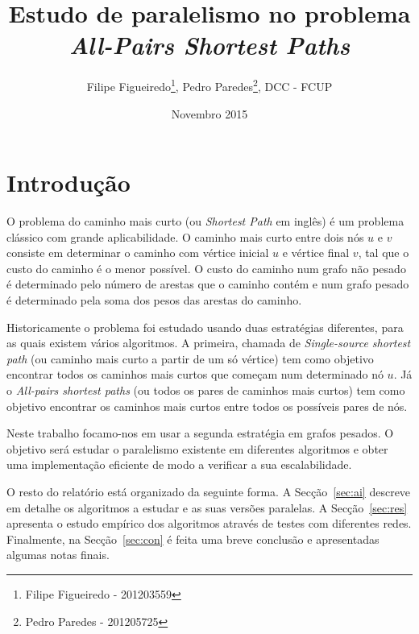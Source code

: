 \documentclass[10pt,a4paper,oneside]{article}
\title{Estudo de paralelismo no problema \textit{All-Pairs Shortest
    Paths}}
\author{Filipe Figueiredo\footnote{Filipe Figueiredo - 201203559},
  Pedro Paredes\footnote{Pedro Paredes - 201205725}, DCC - FCUP}
\date{Novembro 2015}
\begin{document}
\maketitle


\section{Introdução}
\label{sec:intro}
O problema do caminho mais curto (ou \textit{Shortest Path} em inglês)
é um problema clássico com grande aplicabilidade. O caminho mais curto
entre dois nós $u$ e $v$ consiste em determinar o caminho com vértice
inicial $u$ e vértice final $v$, tal que o custo do caminho é o menor
possível. O custo do caminho num grafo não pesado é determinado pelo
número de arestas que o caminho contém e num grafo pesado é
determinado pela soma dos pesos das arestas do caminho.

Historicamente o problema foi estudado usando duas estratégias
diferentes, para as quais existem vários algoritmos. A primeira,
chamada de \textit{Single-source shortest path} (ou caminho mais curto
a partir de um só vértice) tem como objetivo encontrar todos os
caminhos mais curtos que começam num determinado nó $u$. Já o
\textit{All-pairs shortest paths} (ou todos os pares de caminhos mais
curtos) tem como objetivo encontrar os caminhos mais curtos entre
todos os possíveis pares de nós.

Neste trabalho focamo-nos em usar a segunda estratégia em grafos
pesados. O objetivo será estudar o paralelismo existente em diferentes
algoritmos e obter uma implementação eficiente de modo a verificar a
sua escalabilidade.

O resto do relatório está organizado da seguinte forma. A
Secção~\ref{sec:ai} descreve em detalhe os algoritmos a estudar e as
suas versões paralelas. A Secção~\ref{sec:res} apresenta o estudo
empírico dos algoritmos através de testes com diferentes
redes. Finalmente, na Secção~\ref{sec:con} é feita uma breve conclusão
e apresentadas algumas notas finais.


\end{document}
